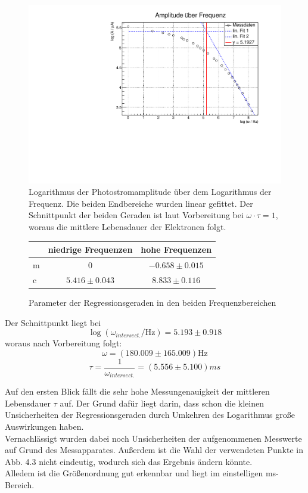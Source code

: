 \begin{figure}
\label{A4_reg}
\centering
\includegraphics[scale=0.5]{../A4/A4_2fits.pdf}
\caption{Logarithmus der Photostromamplitude über dem Logarithmus der Frequenz. Die beiden Endbereiche wurden linear gefittet. Der Schnittpunkt der beiden Geraden ist laut Vorbereitung bei $\omega \cdot \tau = 1$, woraus die mittlere Lebensdauer der Elektronen folgt.}
\end{figure}


\begin{figure}
\label{A4_param}
\caption{Parameter der Regressionsgeraden in den beiden Frequenzbereichen}
\vspace{0.4cm}
\begin{tabular}{lcc}
& niedrige Frequenzen & hohe Frequenzen \\ 
\hline
\hline
m & 0 & $-0.658 \pm 0.015$\\
c & $5.416 \pm 0.043$ & $8.833 \pm 0.116$ \\
\end{tabular}
\end{figure}

Der Schnittpunkt liegt bei 
$$\log(\omega _{intersect.} / \text{Hz}) = 5.193 \pm 0.918$$
woraus nach Vorbereitung folgt:
$$\omega = (180.009 \pm 165.009) \text{Hz} $$
$$\tau = \frac{1}{\omega _{intersect.}} = (5.556 \pm 5.100) ms$$

Auf den ersten Blick fällt die sehr hohe Messungenauigkeit der mittleren Lebensdauer $\tau$ auf. Der Grund dafür liegt darin, dass schon die kleinen Unsicherheiten der Regressionsgeraden durch Umkehren des Logarithmus große Auswirkungen haben. \\
Vernachlässigt wurden dabei noch Unsicherheiten der aufgenommenen Messwerte auf Grund des Messapparates. Außerdem ist die Wahl der verwendeten Punkte in Abb. 4.3 nicht eindeutig, wodurch sich das Ergebnis ändern könnte.\\
Alledem ist die Größenordnung gut erkennbar und liegt im einstelligen ms-Bereich.  

